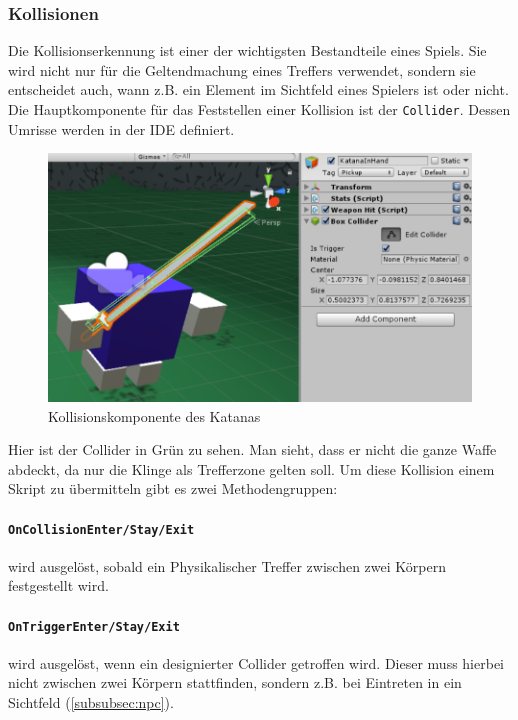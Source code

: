 \subsubsection{Kollisionen}
\label{subsubsec:collider}
Die Kollisionserkennung ist einer der wichtigsten Bestandteile eines Spiels. Sie wird nicht nur für die Geltendmachung eines Treffers verwendet, sondern sie entscheidet auch, wann z.B. ein Element im Sichtfeld eines Spielers ist oder nicht.
Die Hauptkomponente für das Feststellen einer Kollision ist der \lstinline{Collider}.
Dessen Umrisse werden in der IDE definiert.
\begin{figure}[H]
\includegraphics[scale=0.8]{screenshots/katanacollider.png}
\caption{Kollisionskomponente des Katanas}
\end{figure}
\noindent Hier ist der Collider in Grün zu sehen. Man sieht, dass er nicht die ganze Waffe abdeckt, da nur die Klinge als Trefferzone gelten soll.
Um diese Kollision einem Skript zu übermitteln gibt es zwei Methodengruppen:
\paragraph{\lstinline{OnCollisionEnter/Stay/Exit}} wird ausgelöst, sobald ein Physikalischer Treffer zwischen zwei Körpern festgestellt wird.
\paragraph{\lstinline{OnTriggerEnter/Stay/Exit}} wird ausgelöst, wenn ein designierter Collider getroffen wird. Dieser muss hierbei nicht zwischen zwei Körpern stattfinden, sondern z.B. bei Eintreten in ein Sichtfeld (\cref{subsubsec:npc}).






